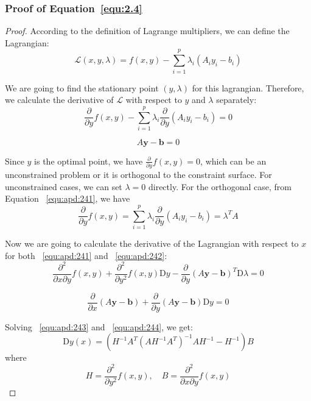 \subsubsection{Proof of Equation~\ref{equ:2.4} \citep{SG:19}}
\label{appendix:equ2.4}
\begin{proof}
    According to the definition of Lagrange multipliers, we can define the Lagrangian:
    $$
    \mathcal{L}(x, y, \lambda)=f(x, y)-\sum_{i=1}^{p} \lambda_{i} (A_{i}y_i - b_i)
    $$
    \par We are going to find the stationary point $(y, \lambda)$ for this lagrangian. Therefore, we calculate the derivative of $\mathcal{L}$ with respect to $y$ and $\lambda$ separately: 
    \begin{equation}
        \label{equ:apd:241}
        \frac{\partial}{\partial y} f(x,y) - \sum_{i=1}^{p} \lambda_{i} \frac{\partial}{\partial y}(A_{i}y_i - b_i) = 0
    \end{equation}
    
    \begin{equation}
        \label{equ:apd:242}
        A \boldsymbol{y} - \boldsymbol{b} = 0
    \end{equation}
    \par Since $y$ is the optimal point, we have $\frac{\partial}{\partial y} f(x,y) = 0$, which can be an unconstrained problem or it is orthogonal to the constraint surface. For unconstrained cases, we can set $\lambda = 0$ directly. For the orthogonal case, from Equation ~\ref{equ:apd:241}, we have
    $$
    \frac{\partial}{\partial y} f(x,y) = \sum_{i=1}^{p} \lambda_{i} \frac{\partial}{\partial y}(A_{i}y_i - b_i) = \lambda^T A
    $$
    \par Now we are going to calculate the derivative of the Lagrangian with respect to $x$ for both ~\ref{equ:apd:241} and ~\ref{equ:apd:242}: 
    \begin{equation}
        \label{equ:apd:243}
        \frac{\partial^2}{\partial x \partial y} f(x, y) +\frac{\partial^2}{\partial y^2} f(x,y) \mathrm{D} y-\frac{\partial}{\partial y} (A\boldsymbol{y}-\boldsymbol{b})^T \mathrm{D} \lambda = 0 
    \end{equation}

    \begin{equation}
        \label{equ:apd:244}
        \frac{\partial}{\partial x} (A\boldsymbol{y}-\boldsymbol{b}) + \frac{\partial}{\partial y} (A\boldsymbol{y}-\boldsymbol{b}) \mathrm{D}y = 0
    \end{equation}
    \par Solving ~\ref{equ:apd:243} and ~\ref{equ:apd:244}, we get:
    $$
    \mathrm{D} y(x)=\left(H^{-1} A^{T}\left(A H^{-1} A^{T}\right)^{-1} A H^{-1}-H^{-1}\right) B
    $$
    where 
    $$
    H = \frac{\partial^2}{\partial y^2} f(x,y) ,\quad
    B = \frac{\partial^2}{\partial x \partial y} f(x,y)
    $$
\end{proof}